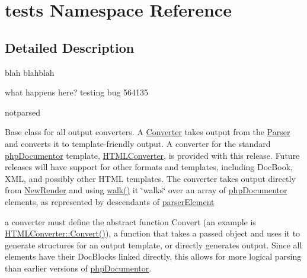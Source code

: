 \hypertarget{namespacetests}{\section{tests \-Namespace \-Reference}
\label{namespacetests}
}


\subsection{\-Detailed \-Description}
blah  blahblah

what happens here? testing bug 564135

notparsed

\-Base class for all output converters. \-A \hyperlink{class_converter}{\-Converter} takes output from the \hyperlink{class_parser}{\-Parser} and converts it to template-\/friendly output. \-A converter for the standard \hyperlink{namespacephp_documentor}{php\-Documentor} template, \hyperlink{}{\-H\-T\-M\-L\-Converter}, is provided with this release. \-Future releases will have support for other formats and templates, including \-Doc\-Book, \-X\-M\-L, and possibly other \-H\-T\-M\-L templates. \-The converter takes output directly from \hyperlink{}{\-New\-Render} and using \hyperlink{}{walk()} it \char`\"{}walks\char`\"{} over an array of \hyperlink{namespacephp_documentor}{php\-Documentor} elements, as represented by descendants of \hyperlink{classparser_element}{parser\-Element}

a converter must define the abstract function \-Convert (an example is \hyperlink{}{\-H\-T\-M\-L\-Converter\-::\-Convert()}), a function that takes a passed object and uses it to generate structures for an output template, or directly generates output. \-Since all elements have their \-Doc\-Blocks linked directly, this allows for more logical parsing than earlier versions of \hyperlink{namespacephp_documentor}{php\-Documentor}.


